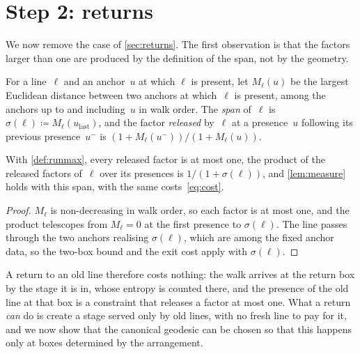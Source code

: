 \documentclass[11pt,letterpaper]{article}
\begin{document}
\section{Step 2: returns}
\label{sec:step2}

We now remove the case of \cref{sec:returns}. The first observation is that the factors larger than one are produced by the definition of the span, not by the geometry.

\begin{definition}
\label{def:runmax}
For a line~$\ell$ and an anchor~$u$ at which $\ell$ is present, let $M_\ell(u)$ be the largest Euclidean distance between two anchors at which~$\ell$ is present, among the anchors up to and including~$u$ in walk order. The \emph{span} of~$\ell$ is $\sigma(\ell)\coloneqq M_\ell(u_{\mathrm{last}})$, and the factor \emph{released} by~$\ell$ at a presence~$u$ following its previous presence~$u^-$ is $(1+M_\ell(u^-))/(1+M_\ell(u))$.
\end{definition}

\begin{lemma}
\label{lem:monotone}
With \cref{def:runmax}, every released factor is at most one, the product of the released factors of~$\ell$ over its presences is $1/(1+\sigma(\ell))$, and \cref{lem:measure} holds with this span, with the same costs~\eqref{eq:cost}.
\end{lemma}

\begin{proof}
$M_\ell$ is non-decreasing in walk order, so each factor is at most one, and the product telescopes from $M_\ell=0$ at the first presence to $\sigma(\ell)$. The line passes through the two anchors realising $\sigma(\ell)$, which are among the fixed anchor data, so the two-box bound and the exit cost apply with $\sigma(\ell)$.
\end{proof}

A return to an old line therefore costs nothing: the walk arrives at the return box by the stage it is in, whose entropy is counted there, and the presence of the old line at that box is a constraint that releases a factor at most one. What a return \emph{can} do is create a stage served only by old lines, with no fresh line to pay for it, and we now show that the canonical geodesic can be chosen so that this happens only at boxes determined by the arrangement.
\end{document}
